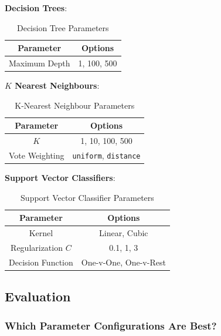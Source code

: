 \documentclass[11pt]{article}
\begin{document}
\textbf{Decision Trees}:
\begin{table}[h]
	\begin{center}
		\begin{tabular}{|c|c|}			
			\hline
			Parameter & Options \\
			\hline
			Maximum Depth & 1, 100, 500 \\
			\hline
		\end{tabular}
		\caption{Decision Tree Parameters}
		\label{tbl:dt-options}
	\end{center}
\end{table}

\textbf{$K$ Nearest Neighbours}:
\begin{table}[H]
	\begin{center}
		\begin{tabular}{|c|c|}			
			\hline
			Parameter & Options \\
			\hline
			$K$ & 1, 10, 100, 500 \\
			Vote Weighting & \texttt{uniform}, \texttt{distance} \\
			\hline
		\end{tabular}
		\caption{K-Nearest Neighbour Parameters}
		\label{tbl:knn-options}
	\end{center}
\end{table}

\textbf{Support Vector Classifiers}:
\begin{table}[H]
	\begin{center}
		\begin{tabular}{|c|c|}			
			\hline
			Parameter & Options \\
			\hline
			Kernel & Linear, Cubic \\
			Regularization $C$ & 0.1, 1, 3 \\
			Decision Function & One-v-One, One-v-Rest \\
			\hline
		\end{tabular}
		\caption{Support Vector Classifier Parameters}
		\label{tbl:svc-options}
	\end{center}
\end{table}


\subsection{Evaluation}\label{sec:evaluations}

\subsubsection{Which Parameter Configurations Are Best?}\label{sec:choosing2}
\end{document}
